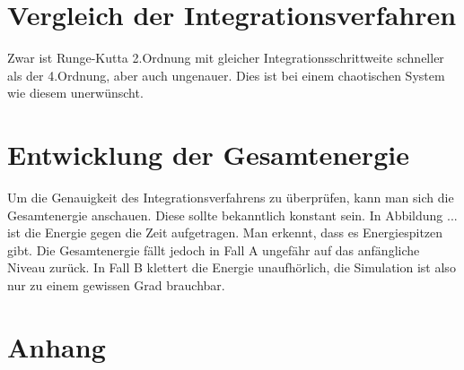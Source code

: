 \documentclass[12pt,a4paper,titlepage,headinclude,bibtotoc]{scrartcl}
\begin{document}
\section{Vergleich der Integrationsverfahren}
Zwar ist Runge-Kutta 2.Ordnung mit gleicher Integrationsschrittweite schneller als der 4.Ordnung, aber auch ungenauer. 
Dies ist bei einem chaotischen System wie diesem unerwünscht.

\section{Entwicklung der Gesamtenergie}
Um die Genauigkeit des Integrationsverfahrens zu überprüfen, kann man sich die Gesamtenergie anschauen.
Diese sollte bekanntlich konstant sein.
In Abbildung ... ist die Energie gegen die Zeit aufgetragen.
Man erkennt, dass es Energiespitzen gibt. 
Die Gesamtenergie fällt jedoch in Fall A ungefähr auf das anfängliche Niveau zurück.
In Fall B klettert die Energie unaufhörlich, die Simulation ist also nur zu einem gewissen Grad brauchbar.

\section{Anhang}
\end{document}
